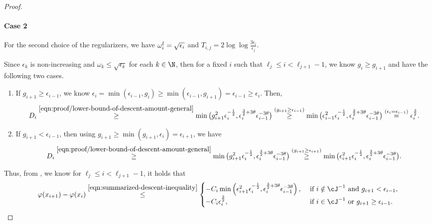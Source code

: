 \begin{proof}
    \paragraph{Case 2}
    For the second choice of the regularizers, we have $\omega_i^{\mathrm{f}} = \sqrt{\epsilon_i}$
    and $T_{i,j} = 2\log\log \frac{3\epsilon_i}{\epsilon_j}$.

    Since $\epsilon_k$ is non-increasing and $\omega_k \leq \sqrt{\epsilon_k}$ for each $k \in \N$,  
    then for a fixed $i$ such that $\ell_j \leq i < \ell_{j+1} - 1$, we know $g_i \geq g_{i+1}$ and have the following two cases.
    \begin{enumerate}
        \item If $g_{i+1} \geq \epsilon_{i-1}$, we know $\epsilon_{i} 
        = \min( \epsilon_{i-1}, g_i) 
        \geq \min( \epsilon_{i-1}, g_{i+1}) 
        = \epsilon_{i-1} \geq \epsilon_i$. 
        Then, 
        \begin{align*}
        D_i 
        \overset{\eqref{eqn:proof/lower-bound-of-descent-amount-general}}{\geq} 
        \min \big (g_{i+1}^2\epsilon_i^{-\frac{1}{2}}, \epsilon_i^{\frac{3}{2} + 3\theta}\epsilon_{i-1}^{-3\theta} \big )
        \overset{(g_{i+1} \geq \epsilon_{i-1})}{\geq}
        \min \big (\epsilon_{i-1}^2\epsilon_i^{-\frac{1}{2}}, \epsilon_i^{\frac{3}{2} + 3\theta}\epsilon_{i-1}^{-3\theta} \big )
        \overset{(\epsilon_i = \epsilon_{i-1})}{=}
        \epsilon_i^{\frac{3}{2}}
        .
        \end{align*}
        \item If $g_{i+1} < \epsilon_{i-1}$, 
        then using $g_{i+1} \geq \min(g_{i+1}, \epsilon_i) =  \epsilon_{i+1}$,
        we have
        \begin{align*}
        D_i 
        \overset{\eqref{eqn:proof/lower-bound-of-descent-amount-general}}{\geq} 
        \min \big (g_{i+1}^2\epsilon_i^{-\frac{1}{2}}, \epsilon_i^{\frac{3}{2} + 3\theta}\epsilon_{i-1}^{-3\theta} \big )
        \overset{(g_{i+1} \geq \epsilon_{i+1})}{\geq}
        \min \big (\epsilon_{i+1}^2\epsilon_i^{-\frac{1}{2}}, \epsilon_i^{\frac{3}{2} + 3\theta}\epsilon_{i-1}^{-3\theta} \big )
        .
        \end{align*}
    \end{enumerate}
    Thus, from , we know for $\ell_j \leq i < \ell_{j+1} - 1$, it holds that
    \begin{align*}
        \varphi(x_{i+1}) - \varphi(x_i)
        \overset{\eqref{eqn:summarized-descent-inequality}}{\leq} 
        \begin{cases}
        -C_i \min \left (\epsilon_{i+1}^2\epsilon_i^{-\frac{1}{2}}, \epsilon_i^{\frac{3}{2} + 3\theta}\epsilon_{i-1}^{-3\theta} \right ),
        & \text{ if } i \notin \cJ^{-1} \text{ and } g_{i+1} < \epsilon_{i-1}, \\
        -C_i \epsilon_i^{\frac{3}{2}}, 
        & \text{ if } i \in \cJ^{-1} \text{ or } g_{i+1} \geq \epsilon_{i-1}.
        \end{cases}
    \end{align*}


\end{proof}
